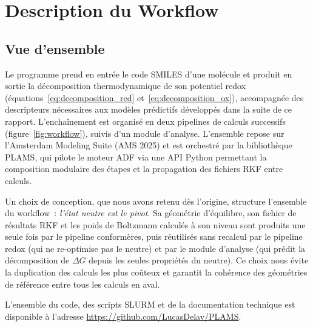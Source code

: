 \section{Description du Workflow}

\subsection{Vue d'ensemble}

Le programme prend en entrée le code SMILES d'une molécule et produit en sortie la décomposition thermodynamique de son potentiel redox (équations~\ref{eq:decomposition_red} et~\ref{eq:decomposition_ox}), accompagnée des descripteurs nécessaires aux modèles prédictifs développés dans la suite de ce rapport. L'enchaînement est organisé en deux pipelines de calculs successifs (figure~\ref{fig:workflow}), suivis d'un module d'analyse. L'ensemble repose sur l'Amsterdam Modeling Suite (AMS 2025) et est orchestré par la bibliothèque PLAMS, qui pilote le moteur ADF via une API Python permettant la composition modulaire des étapes et la propagation des fichiers RKF entre calculs.

Un choix de conception, que nous avons retenu dès l'origine, structure l'ensemble du workflow~: \emph{l'état neutre est le pivot}. Sa géométrie d'équilibre, son fichier de résultats RKF et les poids de Boltzmann calculés à son niveau sont produits une seule fois par le pipeline conformères, puis réutilisés sans recalcul par le pipeline redox (qui ne re-optimise pas le neutre) et par le module d'analyse (qui prédit la décomposition de $\Delta G$ depuis les seules propriétés du neutre). Ce choix nous évite la duplication des calculs les plus coûteux et garantit la cohérence des géométries de référence entre tous les calculs en aval.

L'ensemble du code, des scripts SLURM et de la documentation technique est disponible à l'adresse \url{https://github.com/LucasDelav/PLAMS}.

